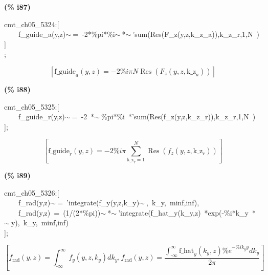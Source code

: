 \documentclass[fleqn]{article}
\begin{document}
\noindent
\begin{minipage}[t]{4.000000em}\color{red}\bfseries
(\% i87)	
\end{minipage}
\begin{minipage}[t]{\textwidth}\color{blue}
cmt\_ch05\_5324:[\\
\ \ \ \ f\_guide\_a(y,z)\ensuremath{\sim\ }=\ -2*\%pi*\%i\ensuremath{\sim\ }*\ensuremath{\sim\ }'sum(Res(F\_z(y,z,k\_z\_a)),k\_z\_r,1,N\ )\\
]\\
;
\end{minipage}
\[\displaystyle \tag{\% o87} 
\left[ {{\ensuremath{\mathrm{f\_ guide}}}_a}\left( y\operatorname{,}z\right) =-2 \% i \ensuremath{\pi}  N \operatorname{Res}\left( {F_z}\left( y\operatorname{,}z\operatorname{,}{{\ensuremath{\mathrm{k\_ z}}}_a}\right) \right) \right] \mbox{}
\]


\noindent
\begin{minipage}[t]{4.000000em}\color{red}\bfseries
(\% i88)	
\end{minipage}
\begin{minipage}[t]{\textwidth}\color{blue}
cmt\_ch05\_5325:[\\
\ \ \ \ f\_guide\_r(y,z)\ensuremath{\sim\ }=\ -2\ *\ensuremath{\sim\ }\%pi*\%i\ *'sum(Res(f\_z(y,z,k\_z\_r)),k\_z\_r,1,N\ )\\
];
\end{minipage}
\[\displaystyle \tag{\% o88} 
\left[ {{\ensuremath{\mathrm{f\_ guide}}}_r}\left( y\operatorname{,}z\right) =-2 \% i \ensuremath{\pi}  \sum_{{{\ensuremath{\mathrm{k\_ z}}}_r}=1}^{N}{\left. \operatorname{Res}\left( {f_z}\left( y\operatorname{,}z\operatorname{,}{{\ensuremath{\mathrm{k\_ z}}}_r}\right) \right) \right.}\right] \mbox{}
\]


\noindent
\begin{minipage}[t]{4.000000em}\color{red}\bfseries
(\% i89)	
\end{minipage}
\begin{minipage}[t]{\textwidth}\color{blue}
cmt\_ch05\_5326:[\\
\ \ \ \ f\_rad(y,z)\ensuremath{\sim\ }=\ 'integrate(f\_y(y,z,k\_y)\ensuremath{\sim\ },\ k\_y,\ minf,inf),\\
\ \ \ \ f\_rad(y,z)\ =\ (1/(2*\%pi))\ensuremath{\sim\ }*\ensuremath{\sim\ }'integrate(f\_hat\_y(k\_y,z)\ *exp(-\%i*k\_y\ *\ensuremath{\sim\ }y),\ k\_y,\ minf,inf)\\
];
\end{minipage}
\[\displaystyle \tag{\% o89} 
\left[ {f_{\ensuremath{\mathrm{rad}}}}\left( y\operatorname{,}z\right) =\int_{\operatorname{-}\infty }^{\infty }{\left. {f_y}\left( y\operatorname{,}z\operatorname{,}{k_y}\right) d{k_y}\right.}\operatorname{,}{f_{\ensuremath{\mathrm{rad}}}}\left( y\operatorname{,}z\right) =\frac{\int_{\operatorname{-}\infty }^{\infty }{\left. {{\ensuremath{\mathrm{f\_ hat}}}_y}\left( {k_y}\operatorname{,}z\right)  {{\% e}^{-\% i {k_y} y}}d{k_y}\right.}}{2 \ensuremath{\pi} }\right] \mbox{}
\]
\end{document}
